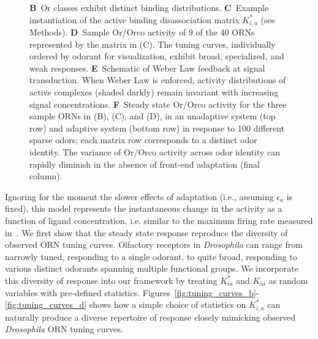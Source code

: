 \begin{figure}[!tb]
{{		\textbf{B}~Or classes exhibit distinct binding distributions. 
		\textbf{C}~Example instantiation of the active binding disassociation matrix $K^*_{i, a}$ (see Methods). 
		\textbf{D}~Sample Or/Orco activity of 9 of the 40 ORNs represented by the matrix in (C). The tuning curves, individually ordered by odorant for visualization, exhibit broad, specialized, and weak responses. 
		\textbf{E}~Schematic of Weber Law feedback at signal transduction. When Weber Law is enforced, activity distributions of active complexes (shaded darkly) remain invariant with increasing signal concentrations. 
		\textbf{F}~Steady state Or/Orco activity for the three sample ORNs in (B), (C), and (D), in an unadaptive system (top row) and adaptive system (bottom row) in response to 100 different sparse odors; each matrix row corresponds to a distinct odor identity. The variance of Or/Orco activity across odor identity can rapidly diminish in the absence of front-end adaptation (final column).
		}}
	\label{fig:tuning_curves}
\end{figure}

Ignoring for the moment the slower effects of adaptation (i.e., assuming $\epsilon_a$ is fixed), this model represents the instantaneous change in the activity as a function of ligand concentration, i.e. similar to the maximum firing rate measured in~\cite{hallem_carlson}. We first show that the steady state response reproduce the diversity of observed ORN tuning curves. Olfactory receptors in \textit{Drosophila} can range from narrowly tuned, responding to a single odorant, to quite broad, responding to various distinct odorants spanning multiple functional groups. We incorporate this diversity of response into our framework by treating $K^*_{ia}$ and $K_{ia}$ as random variables with pre-defined statistics. Figures~\ref{fig:tuning_curves_b}-\ref{fig:tuning_curves_d} shows how a simple choice of statistics on $K^*_{i, a}$ can naturally produce a diverse repertoire of response closely mimicking observed \textit{Drosophila} ORN tuning curves. %

